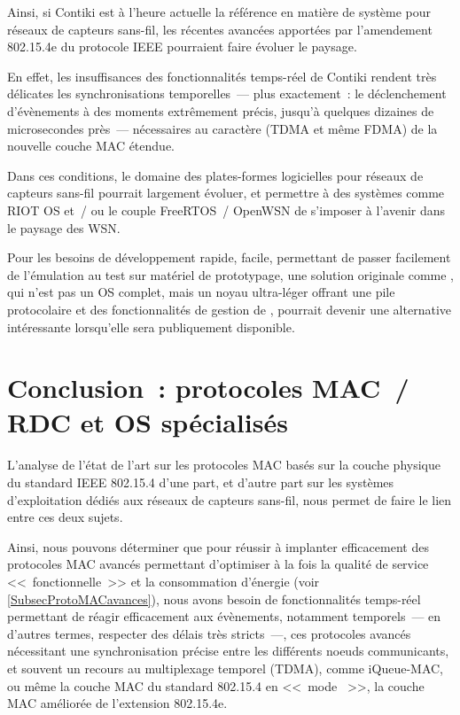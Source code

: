 \bigskip

Ainsi, si Contiki est à l'heure actuelle la référence en matière de
système pour réseaux de capteurs sans-fil, les récentes avancées apportées
par l'amendement 802.15.4e du protocole IEEE pourraient faire évoluer le
paysage.

En effet, les insuffisances des fonctionnalités temps-réel de Contiki
rendent très délicates les synchronisations temporelles~--- plus exactement~:
le déclenchement d'évènements à des moments extrêmement précis, jusqu'à
quelques dizaines de microsecondes près~--- nécessaires au caractère
 (TDMA et même FDMA) de la nouvelle couche MAC étendue.

Dans ces conditions, le domaine des plates-formes logicielles pour réseaux
de capteurs sans-fil pourrait largement évoluer, et permettre à des
systèmes comme RIOT OS et~/ ou le couple FreeRTOS~/ OpenWSN de
s'imposer à l'avenir dans le paysage des WSN.

\bigskip

Pour les besoins de développement rapide, facile, permettant de passer
facilement de l'émulation au test sur matériel de prototypage, une solution
originale comme  \cite{WiNo2013}, qui n'est pas un OS complet,
mais un noyau ultra-léger offrant une pile protocolaire et des
fonctionnalités de gestion de , pourrait devenir une
alternative intéressante lorsqu'elle sera publiquement disponible.


\section{Conclusion~: protocoles MAC~/ RDC et OS spécialisés}
\label{SecConcluChEtatArt}

L'analyse de l'état de l'art sur les protocoles MAC basés sur la couche
physique du standard IEEE 802.15.4 d'une part, et d'autre part sur les
systèmes d'exploitation dédiés aux réseaux de capteurs sans-fil, nous
permet de faire le lien entre ces deux sujets.

Ainsi, nous pouvons déterminer que pour réussir à implanter efficacement
des protocoles MAC avancés permettant d'optimiser à la fois la qualité
de service <<~fonctionnelle~>> et la consommation d'énergie (voir
\vref{SubsecProtoMACavances}), nous avons besoin de fonctionnalités
temps-réel permettant de réagir efficacement aux évènements, notamment
temporels~--- en d'autres termes, respecter des délais très stricts~---,
ces protocoles avancés nécessitant une synchronisation précise entre
les différents noeuds communicants, et souvent un recours au multiplexage
temporel (TDMA), comme iQueue-MAC, ou même la couche MAC du standard
802.15.4 en <<~mode ~>>,  la couche
MAC améliorée de l'extension 802.15.4e.

